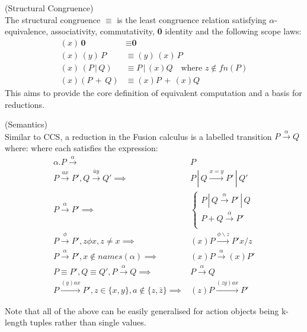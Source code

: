     \begin{definition}{(Structural Congruence)\\}
        \label{fusion-calculus-structural-congruence}
        The structural congruence $\equiv$ is the least congruence relation satisfying $\alpha$-equivalence, associativity, commutativity, \textbf{0} identity and the following scope laws:
        \begin{align*}
            (x) \, \textbf{0}       & \equiv \textbf{0} \\
            (x) \, (y) \, P         & \equiv (y) \, (x) \, P \\
            (x) \, (P \, | \, Q)    & \equiv P \, | \, (x)Q \quad \text{where $z \notin fn(P)$} \\
            (x)(P \, + \, Q)        & \equiv (x)P \, + \, (x)Q
        \end{align*}
        This aims to provide the core definition of equivalent computation and a basis for reductions.
    \end{definition}


    \begin{definition}{(Semantics)\\}
        Similar to CCS, a reduction in the Fusion calculus is a labelled transition $P \xrightarrow{\alpha} Q$ where:
        where each satisfies the expression:
        \begin{align*}
            \alpha . P \xrightarrow{\alpha}                             & P \\
            P \xrightarrow{ux} P', Q \xrightarrow{\bar{u}y} Q' \implies & P \, | \, Q \xrightarrow{x = y} P' \, | \, Q' \\
            P \xrightarrow{\alpha} P' \implies                          &
            \begin{cases}
                P \, | \, Q \xrightarrow{\alpha} P' \, | \, Q \\
                P + Q \xrightarrow{\alpha} P' \\
            \end{cases} \\
            P \xrightarrow{\phi} P', z \phi x, z \neq x \implies                            & (x)P \xrightarrow{\phi \backslash z} P'{x / z} \\
            P \xrightarrow{\alpha} P', x \notin names(\alpha) \implies                      & (x)P \xrightarrow{\alpha} (x)P' \\
            P \equiv P', Q \equiv Q', P \xrightarrow{\alpha} Q \implies                     & P \xrightarrow{\alpha} Q \\
            P \xrightarrow{(y) a x} P', z \in \{x, y\}, a \notin \{z, \bar{z}\} \implies    & (z)P \xrightarrow{(z y) a x} P'
        \end{align*}
    \end{definition}
    Note that all of the above can be easily generalised for action objects being k-length tuples rather than single values.


